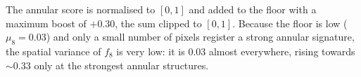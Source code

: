 The annular score is normalised to $[0,1]$ and added to the floor with a
maximum boost of $+0.30$, the sum clipped to $[0, 1]$.  Because the floor is
low ($\mu_8 = 0.03$) and only a small number of pixels register a strong
annular signature, the spatial variance of $f_8$ is very low: it is 0.03
almost everywhere, rising towards $\sim$0.33 only at the strongest annular
structures.
